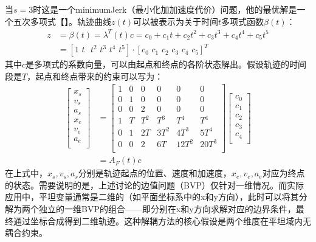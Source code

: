\documentclass[master,academic]{ysuthesis} %
\begin{document}
		当$s=3$时这是一个minimumJerk（最小化加加速度代价）问题，他的最优解是一个五次多项式【】。轨迹曲线$z(t)$可以被表示为关于时间$t$多项式函数$\beta(t)$：
		\begin{equation}
			\begin{aligned}
				z&=\beta (t) =\lambda ^T(t) c=c_0+c_1t+c_2t^2+c_3t^3+c_4t^4+c_5t^5\\
				&=\left[ 1\,\,t\,\,\,\,t^2\,\,t^3\,\,t^4\,\,t^5 \right] \cdot \left[ c_0\,\,c_1\,\,c_2\,\,c_3\,\,c_4\,\,c_5 \right] ^T
			\end{aligned}
		\end{equation}
		其中$c$是多项式的系数向量，可以由起点和终点的各阶状态解出。假设轨迹的时间段是$T$，起点和终点带来的约束可以写为：
		\begin{equation}
			\begin{aligned}
				\left[ \begin{array}{c}
				x_s\\
				v_s\\
				a_s\\
				x_e\\
				v_e\\
				a_e\\
				\end{array} \right] 
				&=\left[ \begin{matrix}
				1&		0&		0&		0&		0&		0\\
				0&		1&		0&		0&		0&		0\\
				0&		0&		2&		0&		0&		0\\
				1&		T&		T^2&		T^3&		T^4&		T^4\\
				0&		1&		2T&		3T^2&		4T^3&		5T^4\\
				0&		0&		2&		6T&		12T^2&		20T^3\\
				\end{matrix} \right] \left[ \begin{array}{c}
				c_0\\
				c_1\\
				c_2\\
				c_3\\
				c_4\\
				\end{array} \right] \\
				&=A_F(t) c
			\end{aligned}
			\label{eq:BVP}
		\end{equation}
		在上式中，$x_s,v_s,a_s$分别是轨迹起点的位置、速度和加速度，$x_e,v_e,a_e$对应为终点的状态。需要说明的是，上述讨论的边值问题（BVP）仅针对一维情况。而实际应用中，平坦变量通常是二维的（如平面坐标系中的x和y方向），此时可以将其分解为两个独立的一维BVP的组合——即分别在x和y方向求解对应的边界条件，最终通过坐标合成得到二维轨迹。这种解耦方法的核心假设是两个维度在平坦域内无耦合约束。
		
\end{document}
